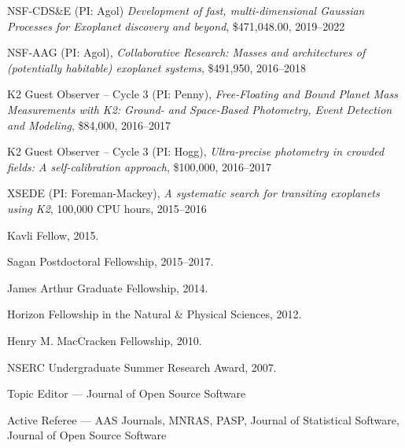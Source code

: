\documentclass[12pt,letterpaper]{article}
\begin{document}
\begin{list}{}{\cvlist}
  \item NSF-CDS\&E (PI: Agol)
        \emph{Development of fast, multi-dimensional Gaussian Processes for Exoplanet discovery and beyond},
        \$471,048.00, 2019--2022

  \item
        NSF-AAG (PI: Agol),
        \emph{Collaborative Research: Masses and architectures of (potentially
          habitable) exoplanet systems},
        \$491,950, 2016--2018

  \item
        K2 Guest Observer -- Cycle 3 (PI: Penny),
        \emph{Free-Floating and Bound Planet Mass Measurements with K2: Ground- and
          Space-Based Photometry, Event Detection and Modeling},
        \$84,000, 2016--2017

  \item
        K2 Guest Observer -- Cycle 3 (PI: Hogg),
        \emph{Ultra-precise photometry in crowded fields: A self-calibration
          approach},
        \$100,000, 2016--2017

  \item
        XSEDE (PI: Foreman-Mackey),
        \emph{A systematic search for transiting exoplanets using K2},
        100,000 CPU hours, 2015--2016
\end{list}


\begin{list}{}{\cvlist}

  \item Kavli Fellow, 2015.
  \item Sagan Postdoctoral Fellowship, 2015--2017.
  \item James Arthur Graduate Fellowship, 2014.
  \item Horizon Fellowship in the Natural \& Physical Sciences, 2012.
  \item Henry M. MacCracken Fellowship, 2010.
  \item NSERC Undergraduate Summer Research Award, 2007.

\end{list}


\begin{list}{}{\cvlist}
  \item Topic Editor --- Journal of Open Source Software
  \item Active Referee ---
        AAS Journals,
        MNRAS,
        PASP,
        Journal of Statistical Software,
        Journal of Open Source Software
\end{list}
\end{document}
